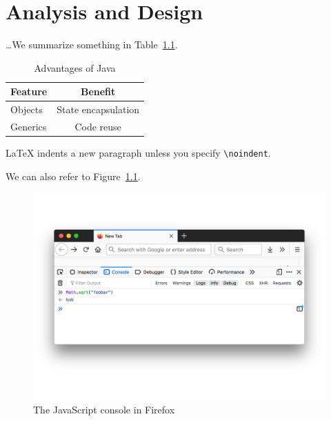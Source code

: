 \chapter{Analysis and Design}
\label{chap:analysis-and-design}

\bigskip

\dots We summarize something in Table~\ref{tab:java-advantages}.

\begin{table}[tb] %
  \centering
  \begin{tabular}{l c}  %
    Feature  & Benefit
    \\\hline
    Objects  & State encapsulation
    \\
    Generics & Code reuse
  \end{tabular}
  \caption{Advantages of Java}
  \label{tab:java-advantages}
\end{table}

\bigskip

\noindent
LaTeX indents a new paragraph unless you specify \lstinline{\noindent}.

\bigskip

We can also refer to Figure~\ref{fig:firefox-js-console}.

\begin{figure}[tb] %
  \centering
  \includegraphics[width=.9\linewidth]{assets/firefox-js-console}
  \caption{The JavaScript console in Firefox }
  \label{fig:firefox-js-console}
\end{figure}
